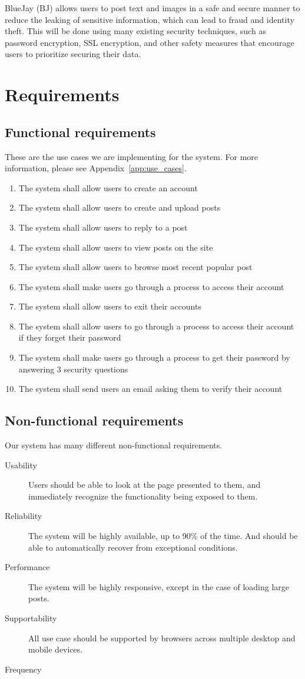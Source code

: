 \documentclass{report}
\begin{document}
	BlueJay (BJ) allows users to post text and images in a safe and secure manner to reduce the leaking of sensitive information,
	which can lead to fraud and identity theft.
	This will be done using many existing security techniques, such as password encryption, SSL encryption,
	and other safety measures that encourage users to prioritize securing their data.
\section{Requirements}

	\subsection{Functional requirements}
	These are the use cases we are implementing for the system.
	For more information, please see Appendix~\ref{app:use_cases}.
	\begin{enumerate}
		\item The system shall allow users to create an account
		\item The system shall allow users to create and upload posts
		\item The system shall allow users to reply to a post
		\item The system shall allow users to view posts on the site
		\item The system shall allow users to browse most recent popular post
		\item The system shall make users go through a process to access their account
		\item The system shall allow users to exit their accounts
		\item The system shall allow users to go through a process to access their account if they forget their password
		\item The system shall make users go through a process to get their password by answering 3 security questions
		\item The system shall send users an email asking them to verify their account
	\end{enumerate}
	\subsection{Non-functional requirements}
	Our system has many different non-functional requirements.
	\begin{description}
		\item [Usability] Users should be able to look at the page presented to them,
		and immediately recognize the functionality being exposed to them.
		\item [Reliability] The system will be highly available, up to 90\% of the time.
		And should be able to automatically recover from exceptional conditions.
		\item [Performance] The system will be highly responsive,
		except in the case of loading large posts.
		\item [Supportability] All use case should be supported by browsers across multiple desktop and mobile devices.
		\item [Frequency]
	\end{description}
\end{document}
